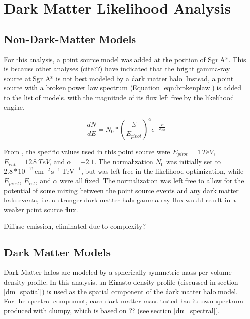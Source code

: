 \section{Dark Matter Likelihood Analysis}
  \subsection{Non-Dark-Matter Models}
  For this analysis, a point source model was added at the position of Sgr A*.
  This is because other analyses (cite??) have indicated that the bright gamma-ray source at Sgr A* is not best modeled by a dark matter halo.
  Instead, a point source with a broken power law spectrum (Equation \ref{eqn:brokenplaw}) is added to the list of models, with the magnitude of its flux left free by the likelihood engine.
  
  \begin{equation}\label{eqn:brokenplaw}
    \frac{dN}{dE} = N_{0} * { \left ( \frac{E}{E_{pivot}} \right ) }^{\alpha} {e}^{-\frac{E}{E_{cut}}}
  \end{equation}
  
  From \cite{VeritasGCRidge2015}, the specific values used in this point source were $E_{pivot}=\SI{1}{TeV}$, $E_{cut}=\SI{12.8}{TeV}$, and $\alpha=-2.1$.
  The normalization $N_{0}$ was initially set to $2.8*{10}^{-12}\,\text{cm}^{-2}\,\text{s}^{-1}\,\text{TeV}^{-1}$, but was left free in the likelihood optimization, while $E_{pivot}$, $E_{cut}$, and $\alpha$ were all fixed.
  The normalization was left free to allow for the potential of some mixing between the point source events and any dark matter halo events, i.e. a stronger dark matter halo gamma-ray flux would result in a weaker point source flux.
  
  Diffuse emission, eliminated due to complexity?

  \subsection{Dark Matter Models}
  Dark Matter halos are modeled by a spherically-symmetric mass-per-volume density profile.
  In this analysis, an Einasto density profile (discussed in section \ref{dm_spatial}) is used as the spatial component of the dark matter halo model.
  For the spectral component, each dark matter mass tested has its own spectrum produced with clumpy, which is based on ?? (see section \ref{dm_spectral}).

